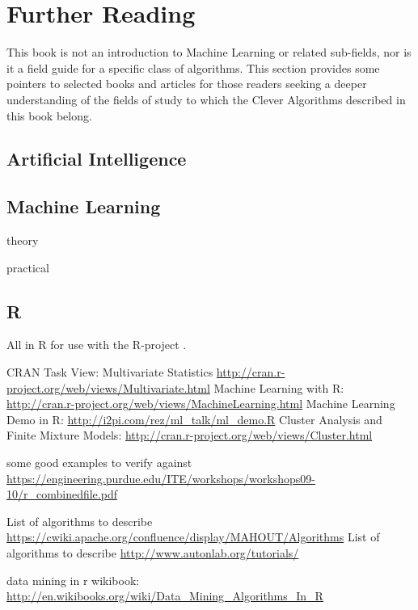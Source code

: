 
\section{Further Reading} 
\label{intro:furtherreading}
This book is not an introduction to Machine Learning or related sub-fields, nor is it a field guide for a specific class of algorithms. This section provides some pointers to selected books and articles for those readers seeking a deeper understanding of the fields of study to which the Clever Algorithms described in this book belong.

\subsection{Artificial Intelligence}


\subsection{Machine Learning}

theory

practical

\subsection{R}

All in R for use with the R-project \cite{RDevelopmentCoreTeam2011}.

CRAN Task View: Multivariate Statistics \url{http://cran.r-project.org/web/views/Multivariate.html}
Machine Learning with R: \url{http://cran.r-project.org/web/views/MachineLearning.html}
Machine Learning Demo in R: \url{http://i2pi.com/rez/ml_talk/ml_demo.R}
Cluster Analysis and Finite Mixture Models: \url{http://cran.r-project.org/web/views/Cluster.html}

some good examples to verify against \url{https://engineering.purdue.edu/ITE/workshops/workshops09-10/r_combinedfile.pdf}

List of algorithms to describe \url{https://cwiki.apache.org/confluence/display/MAHOUT/Algorithms}
List of algorithms to describe \url{http://www.autonlab.org/tutorials/}


data mining in r wikibook: \url{http://en.wikibooks.org/wiki/Data_Mining_Algorithms_In_R}